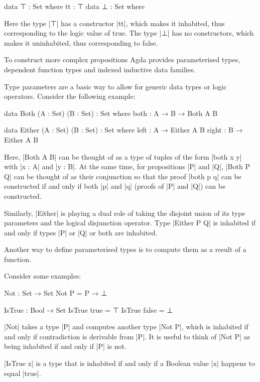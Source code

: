 \begin{code}
data ⊤ : Set where
  tt : ⊤
data ⊥ : Set where
\end{code}

Here the type |⊤| has a constructor |tt|, which makes it inhabited, thus corresponding to the logic value of true.
The type |⊥| has no constructors, which makes it uninhabited, thus corresponding to false.

To construct more complex propositions Agda provides parameterised types, dependent function types and indexed inductive data families.

Type parameters are a basic way to allow for generic data types or logic operators. Consider the following example:

\begin{code}
data Both (A : Set) (B : Set) : Set where
  both : A → B → Both A B

data Either (A : Set) (B : Set) : Set where
  left : A → Either A B
  right : B → Either A B
\end{code}

Here, |Both A B| can be thought of as a type of tuples of the form |both x y| with |x : A| and |y : B|.
At the same time, for propositions |P| and |Q|, |Both P Q| can be thought of as their conjunction so that the proof |both p q| 
can be constructed if and only if both |p| and |q| (proofs of |P| and |Q|) can be constructed.

Similarly, |Either| is playing a dual role of taking the disjoint union of its type parameters
and the logical disjunction operator. Type |Either P Q| is inhabited if and only if types |P| or |Q| or both are inhabited.

Another way to define parameterised types is to compute them as a result of a function.

Consider some examples:

\begin{code}
Not : Set → Set
Not P = P → ⊥

IsTrue : Bool → Set
IsTrue true = ⊤
IsTrue false = ⊥

\end{code}

|Not| takes a type |P| and computes another type |Not P|, 
which is inhabited if and only if contradiction is derivable from |P|.
It is useful to think of |Not P| as being inhabited if and only if |P| is not.

|IsTrue x| is a type that is inhabited if and only if a Boolean value |x| happens to equal |true|.

